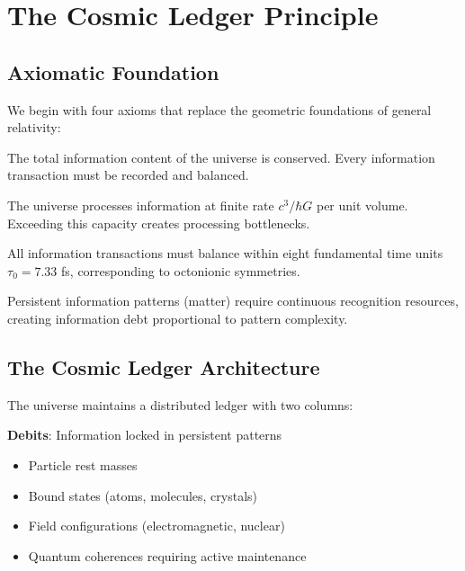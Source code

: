 \documentclass[12pt]{article}
\begin{document}
\section{The Cosmic Ledger Principle}

\subsection{Axiomatic Foundation}

We begin with four axioms that replace the geometric foundations of general relativity:

\begin{axiom}
The total information content of the universe is conserved. Every information transaction must be recorded and balanced.
\end{axiom}

\begin{axiom}
The universe processes information at finite rate $c^3/\hbar G$ per unit volume. Exceeding this capacity creates processing bottlenecks.
\end{axiom}

\begin{axiom}
All information transactions must balance within eight fundamental time units $\tau_0 = 7.33$ fs, corresponding to octonionic symmetries.
\end{axiom}

\begin{axiom}
Persistent information patterns (matter) require continuous recognition resources, creating information debt proportional to pattern complexity.
\end{axiom}

\subsection{The Cosmic Ledger Architecture}

The universe maintains a distributed ledger with two columns:

\textbf{Debits}: Information locked in persistent patterns
\begin{itemize}
\item Particle rest masses
\item Bound states (atoms, molecules, crystals)
\item Field configurations (electromagnetic, nuclear)
\item Quantum coherences requiring active maintenance
\end{itemize}
\end{document}

